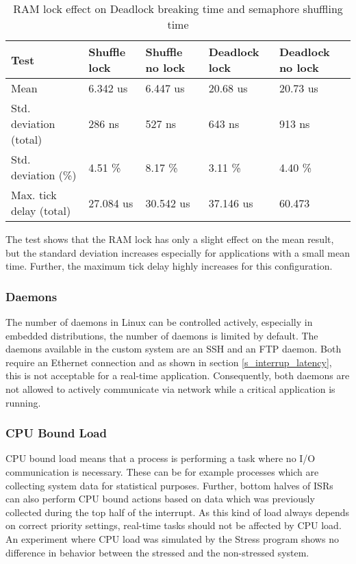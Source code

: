 \begin{table}[htbp]
	\centering
		\begin{tabular}{|l||l||l||l|l|}
			\hline
				Test 											& Shuffle lock & Shuffle no lock & Deadlock lock & Deadlock no lock \\
				\hline 
				Mean  										& 6.342 us		 & 6.447 us 			 & 20.68 us			 & 20.73 us					\\
			  \hline
			  Std. deviation (total)	  & 286 ns			 & 527 ns 				 & 643 ns				 & 913 ns						\\
			  \hline 
			  Std. deviation (\%)  			& 4.51 \%			 & 8.17 \% 				 & 3.11 \% 			 & 4.40 \%					\\ 
			  \hline
			  Max. tick delay	(total)		& 27.084 us	 	 & 30.542 us 			 & 37.146 us		 & 60.473 				\\
			\hline
		\end{tabular}
	\caption{RAM lock effect on Deadlock breaking time and semaphore shuffling time}
	\label{tab_results_ram_lock}
\end{table}

The test shows that the \ac{RAM} lock has only a slight effect on the mean result, but the standard deviation increases especially for applications with a small mean time. 
Further, the maximum tick delay highly increases for this configuration.

\subsubsection{Daemons}
The number of daemons in Linux can be controlled actively, especially in embedded distributions, the number of daemons is limited by default.
The daemons available in the custom system are an \ac{SSH} and an \ac{FTP} daemon.
Both require an Ethernet connection and as shown in section \ref{s_interrup_latency}, this is not acceptable for a real-time application.
Consequently, both daemons are not allowed to actively communicate via network while a critical application is running.

\subsubsection{CPU Bound Load}
\ac{CPU} bound load means that a process is performing a task where no \ac{I/O} communication is necessary.
These can be for example processes which are collecting system data for statistical purposes. 
Further, bottom halves of \acp{ISR} can also perform \ac{CPU} bound actions based on data which was previously collected during the top half of the interrupt.
As this kind of load always depends on correct priority settings, real-time tasks should not be affected by \ac{CPU} load. 
An experiment where \ac{CPU} load was simulated by the Stress program shows no difference in behavior between the stressed and the non-stressed system.

